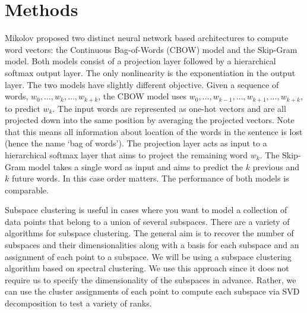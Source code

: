 \section{Methods}\label{sec:methods}

Mikolov \etal \cite{mikolov1, mikolov2} proposed two distinct neural network based architectures to compute word vectors: the Continuous Bag-of-Words (CBOW) model and the Skip-Gram model. 
Both models consist of a projection layer followed by a hierarchical softmax output layer. 
The only nonlinearity is the exponentiation in the output layer. 
The two models have slightly different objective. 
Given a sequence of words, $w_0, \hdots , w_k, \hdots, w_{k+k}$, the CBOW model uses $w_0, \hdots, w_{k-1}, \hdots, w_{k+1}, \hdots, w_{k+k}$, to predict $w_k$. 
The input words are represented as one-hot vectors and are all projected down into the same position by averaging the projected vectors. 
Note that this means all information about location of the words in the sentence is lost (hence the name `bag of words'). 
The projection layer acts as input to a hierarchical softmax layer that aims to project the remaining word $w_k$. 
The Skip-Gram model takes a single word as input and aims to predict the $k$ previous and $k$ future words.
In this case order matters. 
The performance of both models is comparable.

Subspace clustering is useful in cases where you want to model a collection of data points that belong to a union of several subspaces.
There are a variety of algorithms for subspace clustering. The general aim is to recover the number of subspaces and their dimensionalities along with a basis for each subspace and an assignment of each point to a subspace. 
We will be using a subspace clustering algorithm based on spectral clustering. We use this approach since it does not require us to specify the dimensionality of the subspaces in advance. Rather, we can use the cluster assignments of each point to compute each subspace via SVD decomposition to test a variety of ranks. 
